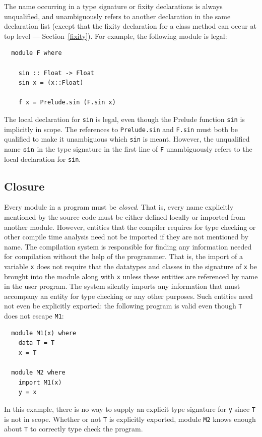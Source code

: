 The name occurring in a type signature or fixity declarations is
always unqualified, and unambiguously refers to another declaration in
the same declaration list (except that the fixity declaration for a
class method can occur at top level --- Section~\ref{fixity}). For example,
the following module is legal:
\bprog
{\small\begin{verbatim}
  module F where

    sin :: Float -> Float
    sin x = (x::Float)

    f x = Prelude.sin (F.sin x)
\end{verbatim}}
\eprog
The local declaration for \mbox{\tt sin} is
legal, even though the Prelude function \mbox{\tt sin} is implicitly in
scope. The references to \mbox{\tt Prelude.sin} and \mbox{\tt F.sin} must both be qualified
to make it unambiguous which \mbox{\tt sin} is meant. However, the unqualified
name \mbox{$\it \makebox{\tt sin}$} in the type signature in the first line of \mbox{\tt F} unambiguously
refers to the local declaration for \mbox{\tt sin}.

\subsection{Closure}
\label{closure}

Every module in a \Haskell{} program must be {\em closed}.  That is,
every name explicitly mentioned by the source code
must be either defined locally or imported from another module.
However, entities that the compiler requires for type checking or other
compile time analysis need not be imported if they are not mentioned
by name.  The \Haskell{} compilation system is responsible for finding
any information needed for compilation without the help of the
programmer.  That is, the import of a variable \mbox{\tt x} does not
require that the datatypes and classes in the signature of \mbox{\tt x} be
brought into the module along with \mbox{\tt x} unless these entities are
referenced by name in the user program.  The \Haskell{}
system silently imports any information that must accompany an
entity for type checking or any other purposes.  Such entities need
not even be explicitly exported: the following program is valid even though
\mbox{\tt T} does not escape \mbox{\tt M1}:
\bprog
{\small\begin{verbatim}
  module M1(x) where
    data T = T
    x = T
  
  module M2 where
    import M1(x)
    y = x
\end{verbatim}}
\eprog
In this example, there is no way to supply an explicit type signature
for \mbox{\tt y} since \mbox{\tt T} is not in scope.
Whether or not \mbox{\tt T} is explicitly exported, module \mbox{\tt M2} knows
enough about \mbox{\tt T} to correctly type check the program.

